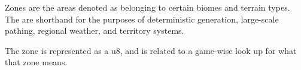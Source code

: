 Zones are the areas denoted as belonging to certain biomes and terrain types. The are shorthand for the purposes of deterministic generation, large-scale pathing, regional weather, and territory systems. 

The zone is represented as a u8, and is related to a game-wise look up for what that zone means.